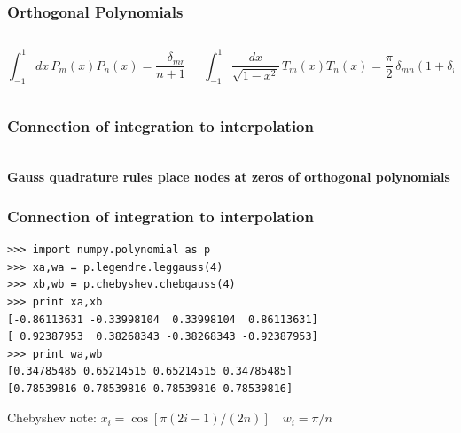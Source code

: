 \begin{frame}
  \frametitle{Orthogonal Polynomials\\
    }
  \begin{columns}
    \begin{column}{0.5\textwidth}
      \begin{equation*}
        \int_{-1}^{1} dx \, P_m(x) P_n(x) = \frac{\delta_{mn}}{n+1/2}
      \end{equation*}
    \end{column}
    \begin{column}{0.5\textwidth}
      \begin{equation*}
        \int_{-1}^{1} \frac{dx}{\sqrt{1-x^2}} \, T_m(x) T_n(x) = \frac{\pi}{2} \, \delta_{mn} (1+\delta_{n0})
      \end{equation*}
    \end{column}
  \end{columns}
  \begin{center}
  \end{center}
\end{frame}
\begin{frame}
  \frametitle{Connection of integration to interpolation\\
    \csub{\small }}
  \centering
  \\
  \textbf{\large Gauss quadrature rules place nodes at zeros of orthogonal polynomials}
\end{frame}
\begin{frame}[fragile]
  \frametitle{Connection of integration to interpolation\\
    }
\begin{verbatim}
>>> import numpy.polynomial as p
>>> xa,wa = p.legendre.leggauss(4)
>>> xb,wb = p.chebyshev.chebgauss(4)
>>> print xa,xb
[-0.86113631 -0.33998104  0.33998104  0.86113631] 
[ 0.92387953  0.38268343 -0.38268343 -0.92387953]
>>> print wa,wb
[0.34785485 0.65214515 0.65214515 0.34785485]
[0.78539816 0.78539816 0.78539816 0.78539816]
\end{verbatim}
Chebyshev note: $x_i = \cos[\pi(2i-1)/(2n)] \quad w_i = \pi/n$
\end{frame}
